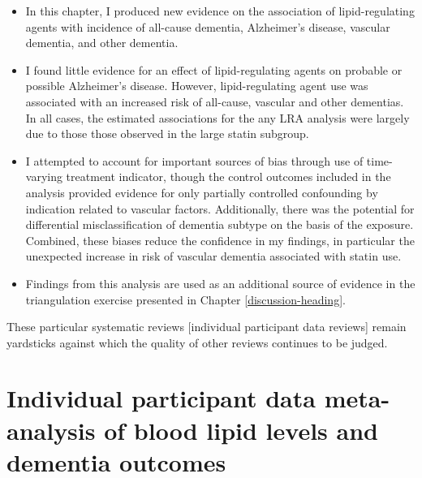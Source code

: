 \documentclass[a4paper, twoside]{templates/ociamthesis}
\begin{document}
\begin{itemize}
\item
  In this chapter, I produced new evidence on the association of lipid-regulating agents with incidence of all-cause dementia, Alzheimer's disease, vascular dementia, and other dementia.
\item
  I found little evidence for an effect of lipid-regulating agents on probable or possible Alzheimer's disease. However, lipid-regulating agent use was associated with an increased risk of all-cause, vascular and other dementias. In all cases, the estimated associations for the any LRA analysis were largely due to those those observed in the large statin subgroup.
\item
  I attempted to account for important sources of bias through use of time-varying treatment indicator, though the control outcomes included in the analysis provided evidence for only partially controlled confounding by indication related to vascular factors. Additionally, there was the potential for differential misclassification of dementia subtype on the basis of the exposure. Combined, these biases reduce the confidence in my findings, in particular the unexpected increase in risk of vascular dementia associated with statin use.
\item
  Findings from this analysis are used as an additional source of evidence in the triangulation exercise presented in Chapter \ref{discussion-heading}.
\end{itemize}

\begin{savequote}
These particular systematic reviews {[}individual participant data
reviews{]} remain yardsticks against which the quality of other reviews
continues to be judged.
\end{savequote}



\hypertarget{ipd-heading}{%
\chapter{Individual participant data meta-analysis of blood lipid levels and dementia outcomes}\label{ipd-heading}}

~

\minitoc 
\end{document}
